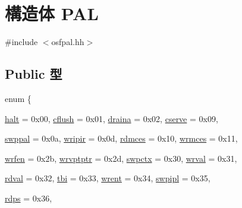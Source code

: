 \hypertarget{structPAL}{
\section{構造体 PAL}
\label{structPAL}
}


{\ttfamily \#include $<$osfpal.hh$>$}\subsection*{Public 型}
\begin{DoxyCompactItemize}
\item 
enum \{ \par
\hyperlink{structPAL_adf764cbdea00d65edcd07bb9953ad2b7abc30d923cf34d24d10953285548f949d}{halt} =  0x00, 
\hyperlink{structPAL_adf764cbdea00d65edcd07bb9953ad2b7acc46bf49e4ede4f89b15acc2052da1e5}{cflush} =  0x01, 
\hyperlink{structPAL_adf764cbdea00d65edcd07bb9953ad2b7aed3d8af01d7bc2a30c8064fe9526cd5e}{draina} =  0x02, 
\hyperlink{structPAL_adf764cbdea00d65edcd07bb9953ad2b7a86cd62163f4279dd4b10970db3b06743}{cserve} =  0x09, 
\par
\hyperlink{structPAL_adf764cbdea00d65edcd07bb9953ad2b7a24929827f1ba448cad2d915b9b62e432}{swppal} =  0x0a, 
\hyperlink{structPAL_adf764cbdea00d65edcd07bb9953ad2b7a58363b83690767e7c3c99c12f24d389f}{wripir} =  0x0d, 
\hyperlink{structPAL_adf764cbdea00d65edcd07bb9953ad2b7a0835b19d94b5363bedd717cb7add7cdf}{rdmces} =  0x10, 
\hyperlink{structPAL_adf764cbdea00d65edcd07bb9953ad2b7a8b864c935c0f43849fdb6653dcd6f25b}{wrmces} =  0x11, 
\par
\hyperlink{structPAL_adf764cbdea00d65edcd07bb9953ad2b7a72b6b6aeb57db2d2ca240d32555a7cc1}{wrfen} =  0x2b, 
\hyperlink{structPAL_adf764cbdea00d65edcd07bb9953ad2b7a262087c713ab00e0a64e122a93deeac5}{wrvptptr} =  0x2d, 
\hyperlink{structPAL_adf764cbdea00d65edcd07bb9953ad2b7ae7df987951d08261a6786653c7bda61f}{swpctx} =  0x30, 
\hyperlink{structPAL_adf764cbdea00d65edcd07bb9953ad2b7aeb845976b5e3be758221261c664da27c}{wrval} =  0x31, 
\par
\hyperlink{structPAL_adf764cbdea00d65edcd07bb9953ad2b7aac8413679a8ad86763fb8513f0960b8c}{rdval} =  0x32, 
\hyperlink{structPAL_adf764cbdea00d65edcd07bb9953ad2b7add46815b4a1d7a293311b419d4496cb7}{tbi} =  0x33, 
\hyperlink{structPAL_adf764cbdea00d65edcd07bb9953ad2b7a7b9ada89bd79a8baa6d0f0c1d3f6a762}{wrent} =  0x34, 
\hyperlink{structPAL_adf764cbdea00d65edcd07bb9953ad2b7adb024e1a40249c54373b6ac1650cc3a8}{swpipl} =  0x35, 
\par
\hyperlink{structPAL_adf764cbdea00d65edcd07bb9953ad2b7a40dae78e0ecbe1d7734f30a6b5b7fa79}{rdps} =  0x36, 

\end{DoxyCompactItemize}
